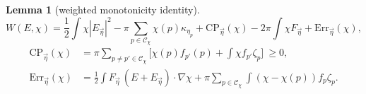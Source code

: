 \documentclass[11pt,reqno]{amsart}
\numberwithin{equation}{section}
\theoremstyle{plain}
\newtheorem{lemma}[theorem]{Lemma}
\theoremstyle{definition}
\newcommand{\CP}{\mathrm{CP}}
\begin{document}
\begin{lemma}[weighted monotonicity identity]\label{lem:mono}
\begin{equation}\label{eq:mono}
W(E,\chi)=\frac12\int\chi|E_{\vec\eta}|^2-\pi\sum_{p\in\mathcal C_\chi}\chi(p)\kappa_{\eta_p}+\CP_{\vec\eta}(\chi)-2\pi\int\chi F_{\vec\eta}+\mathrm{Err}_{\vec\eta}(\chi),
\end{equation}
\begin{align*}
\CP_{\vec\eta}(\chi)&=\pi\sum_{p\ne p'\in\mathcal C_\chi}\Big[\chi(p)f_{p'}(p)+\int\chi f_{p'}\zeta_p\Big]\ \ge0,\\
\mathrm{Err}_{\vec\eta}(\chi)&=\frac12\int F_{\vec\eta}\,(E+E_{\vec\eta})\cdot\nabla\chi+\pi\sum_{p\in\mathcal C_\chi}\int(\chi-\chi(p))f_p\zeta_p .
\end{align*}
\end{lemma}
\end{document}
